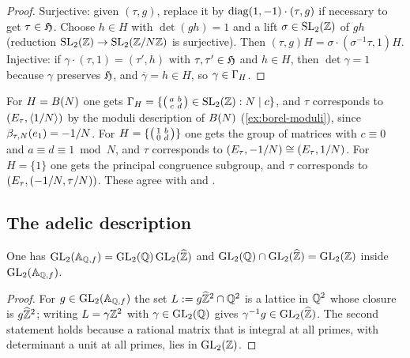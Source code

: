 \begin{proof}
Surjective: given $(\tau, g)$, replace it by
$\mathrm{diag}(1,-1)\cdot(\tau, g)$ if necessary to get
$\tau \in \mathfrak{H}$. Choose $h \in H$ with $\det(gh) = 1$ and a lift
$\sigma \in \SL{2}{\ZZ}$ of $gh$ (reduction $\SL{2}{\ZZ} \to \SL{2}{\ResidueRing{N}}$
is surjective). Then $(\tau, g)H = \sigma\cdot(\sigma^{-1}\tau, 1)H$.
Injective: if $\gamma\cdot(\tau, 1) = (\tau', h)$ with
$\tau, \tau' \in \mathfrak{H}$ and $h \in H$, then $\det\gamma = 1$
because $\gamma$ preserves $\mathfrak{H}$, and
$\overline{\gamma} = h \in H$, so $\gamma \in \GammaOfLevel{H}$.
\end{proof}

\begin{example}
\label{ex:classical-groups}
For $H = B(N)$ one gets
$\GammaOfLevel{H} = \{\smallMat{a}{b}{c}{d} \in \SL{2}{\ZZ} : N \mid c\}$, and
$\tau$ corresponds to $(E_{\tau}, \langle 1/N\rangle)$ by
the moduli description of $B(N)$ (\cref{ex:borel-moduli}), since
$\beta_{\tau,N}(e_{1}) = -1/N$. For
$H = \{\left(\begin{smallmatrix} 1 & b \\ 0 & d \end{smallmatrix}\right)\}$ one gets the group of matrices with
$c \equiv 0$ and $a \equiv d \equiv 1 \bmod N$, and $\tau$ corresponds to
$(E_{\tau}, -1/N) \cong (E_{\tau}, 1/N)$. For $H = \{1\}$ one
gets the principal congruence subgroup, and $\tau$ corresponds to
$(E_{\tau}, (-1/N, \tau/N))$. These agree with
\cite[Thm.~1.5.1]{DiamondShurman2005} and \cite[\S 7.2]{DiamondIm1995}.
\end{example}

\subsection{The adelic description}

\begin{lemma}\label{lem:gl2-class-number-one}
One has $\GL{2}{\FiniteAdeles{\QQ}} = \GL{2}{\QQ}\,\GL{2}{\ProfiniteIntegers}$
and $\GL{2}{\QQ} \cap \GL{2}{\ProfiniteIntegers} = \GL{2}{\ZZ}$ inside
$\GL{2}{\FiniteAdeles{\QQ}}$.
\end{lemma}

\begin{proof}
For $g \in \GL{2}{\FiniteAdeles{\QQ}}$ the set
$L := g\widehat{\mathbb{Z}}^{2} \cap \mathbb{Q}^{2}$ is a
lattice in $\mathbb{Q}^{2}$ whose closure is
$g\widehat{\mathbb{Z}}^{2}$; writing $L = \gamma\mathbb{Z}^{2}$
with $\gamma \in \GL{2}{\QQ}$ gives $\gamma^{-1}g \in \GL{2}{\ProfiniteIntegers}$.
The second statement holds because a rational matrix that is integral at
all primes, with determinant a unit at all primes, lies in $\GL{2}{\ZZ}$.
\end{proof}

